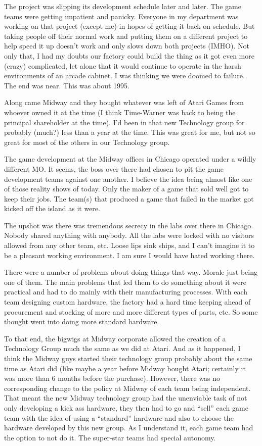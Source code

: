 The project was slipping its development schedule later and later. The game teams were getting impatient and panicky. Everyone in my department was working on that project (except me) in hopes of getting it back on schedule. But taking people off their normal work and putting them on a different project to help speed it up doesn't work and only slows down both projects (IMHO). Not only that, I had my doubts our factory could build the thing as it got even more (crazy) complicated, let alone that it would continue to operate in the harsh environments of an arcade cabinet. I was thinking we were doomed to failure. The end was near. This was about 1995.

Along came Midway and they bought whatever was left of Atari Games from whoever owned it at the time (I think Time-Warner was back to being the principal shareholder at the time). I'd been in that new Technology group for probably (much?) less than a year at the time. This was great for me, but not so great for most of the others in our Technology group.

The game development at the Midway offices in Chicago operated under a wildly different MO. It seems, the boss over there had chosen to pit the game development teams against one another. I believe the idea being almost like one of those reality shows of today. Only the maker of a game that sold well got to keep their jobs. The team(s) that produced a game that failed in the market got kicked off the island as it were. 

The upshot was there was tremendous secrecy in the labs over there in Chicago. Nobody shared anything with anybody. All the labs were locked with no visitors allowed from any other team, etc. Loose lips sink ships, and I can't imagine it to be a pleasant working environment. I am sure I would have hated working there.

There were a number of problems about doing things that way. Morale just being one of them. The main problems that led them to do something about it were practical and had to do mainly with their manufacturing processes. With each team designing custom hardware, the factory had a hard time keeping ahead of procurement and stocking of more and more different types of parts, etc. So some thought went into doing more standard hardware. 

To that end, the bigwigs at Midway corporate allowed the creation of a Technology Group much the same as we did at Atari. And as it happened, I think the Midway guys started their technology group probably about the same time as Atari did (like maybe a year before Midway bought Atari; certainly it was more than 6 months before the purchase). However, there was no corresponding change to the policy at Midway of each team being independent. That meant the new Midway technology group had the unenviable task of not only developing a kick ass hardware, they then had to go and “sell” each game team with the idea of using a “standard” hardware and also to choose the hardware developed by this new group. As I understand it, each game team had the option to not do it. The super-star teams had special autonomy.

